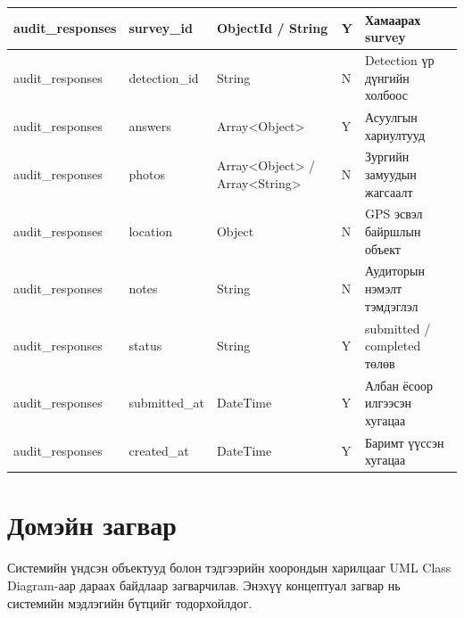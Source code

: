 \begin{longtable}{|P{0.14}|P{0.22}|P{0.15}|P{0.06}|P{0.35}|}
\hline
audit\_responses & survey\_id & ObjectId / String & Y & Хамаарах survey \\
\hline
audit\_responses & detection\_id & String & N & Detection үр дүнгийн холбоос \\
\hline
audit\_responses & answers & Array<Object> & Y & Асуулгын хариултууд \\
\hline
audit\_responses & photos & Array<Object> / Array<String> & N & Зургийн замуудын жагсаалт \\
\hline
audit\_responses & location & Object & N & GPS эсвэл байршлын объект \\
\hline
audit\_responses & notes & String & N & Аудиторын нэмэлт тэмдэглэл \\
\hline
audit\_responses & status & String & Y & submitted / completed төлөв \\
\hline
audit\_responses & submitted\_at & DateTime & Y & Албан ёсоор илгээсэн хугацаа \\
\hline
audit\_responses & created\_at & DateTime & Y & Баримт үүссэн хугацаа \\
\hline
\end{longtable}
\endgroup

\section{Домэйн загвар}

Системийн үндсэн объектууд болон тэдгээрийн хоорондын харилцааг UML Class Diagram-аар дараах байдлаар загварчилав. Энэхүү концептуал загвар нь системийн мэдлэгийн бүтцийг тодорхойлдог.

